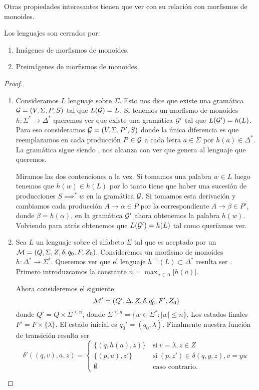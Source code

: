 \documentclass[tesis.tex]{subfiles}
\begin{document}
Otras propiedades interesantes tienen que ver con su relación con morfismos de monoides. 

\begin{prop}\label{morfismos-monoides-ic}
	Los lenguajes \ic son cerrados por:
	\begin{enumerate}
		\item Imágenes de morfismos de monoides.
		\item Preimágenes de morfismos de monoides.
	\end{enumerate}
\end{prop}

\begin{proof}
	\begin{enumerate}
		\item Consideramos $L$ lenguaje \ic sobre $\Sigma$.
		Esto nos dice que existe una gramática ${\cal G} = (V, \Sigma, P, S) $ tal que $L({\cal G}) = L$.
		Si tenemos un morfismo de monoides $h: \Sigma^* \to \Delta^*$ queremos ver que existe una gramática ${\cal G}'$ tal que $L({\cal G}') = h(L)$.
		Para eso consideramos ${\cal G}  = (V, \Sigma, P', S)$ donde la única diferencia es que reemplazamos en cada producción $P \in {\cal G}$ a cada letra $a \in \Sigma$ por $h(a) \in \Delta^*$.
		La gramática sigue siendo \ic, nos alcanza con ver que genera al lenguaje que queremos.
		
		Miramos las dos contenciones a la vez.		
		Si tomamos una palabra $w \in L$ luego tenemos que $h(w) \in h(L)$ por lo tanto tiene que haber una sucesión de producciones $S  \implies^* w  $ en la gramática ${\cal G}$.
		Si tomamos esta derivación y cambiamos cada producción $A \to \alpha \in P$ por la correspondiente $A \to \beta \in P'$, donde $\beta = h(\alpha)$, en la gramática ${\cal G}'$ ahora obtenemos la palabra $h(w)$.
		Volviendo para atrás obtenemos que $L({\cal G}') = h(L)$ tal como queríamos ver.
		
		\item Sea $L$ un lenguaje \ic sobre el alfabeto $\Sigma$ tal que es aceptado por un \APND ${\cal M } = (Q, \Sigma, Z, \delta, q_0, F, Z_0)$.
		Consideremos un morfismo de monoides $h: \Delta^* \to \Sigma^*$. 
		Queremos ver que el lenguaje $h^{-1}(L) \subset \Delta^*$ resulta ser \ic. 
		Primero introduzcamos la constante $ n = \max_{a \in \Delta} |h(a)|$.
		
		Ahora consideremos el siguiente \APND 
		\[
			{\cal M' } = (Q', \Delta, Z, \delta, q_0', F', Z_0)
		\]
		donde $Q' = Q \times \Sigma^{\le n}$, donde $\Sigma^{\le n} = \{ w \in \Sigma^* : |w| \le n  \}$.
		Los estados finales $F' = F \times \{ \lambda \}$.
		El estado inicial es $q_0' = (q_0, \lambda)$.
		Finalmente nuestra función de transición resulta ser 
		\[
		\delta'((q,v), a ,z) = 
		\begin{cases}
		\{(q,h(a), z )\}  \ &\text{si} \ v=\lambda, z \in Z \\
		\{(p,u),z' \} \ &\text{si} \ (p,z') \in \delta(q,y,z), v=yu \\  
		\emptyset \ &\text{caso contrario}.
		\end{cases}
		\]
		

\end{enumerate}
\end{proof}
\end{document}
